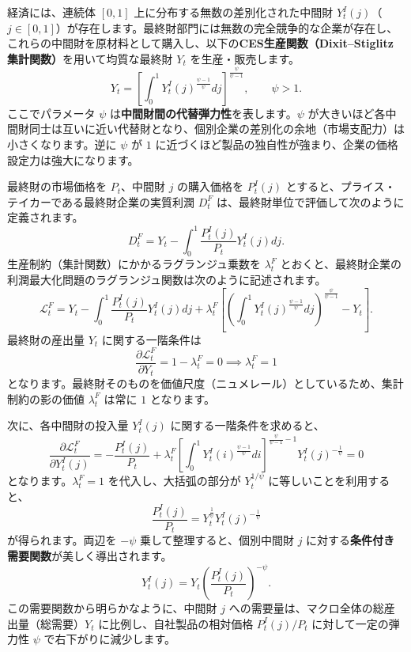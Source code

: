 \documentclass[
  japanese,
  lualatex,
  ja=standard,
  12pt,
  a4paper]{ltjsarticle}
\begin{document}
経済には、連続体 \([0, 1]\) 上に分布する無数の差別化された中間財
\(Y_t^I(j)\)（\(j \in [0, 1]\)）が存在します。最終財部門には無数の完全競争的な企業が存在し、これらの中間財を原材料として購入し、以下の\textbf{CES生産関数（Dixit--Stiglitz
集計関数）}を用いて均質な最終財 \(Y_t\) を生産・販売します。 \[
Y_t = \left[ \int_0^1 Y_t^I(j)^{\frac{\psi-1}{\psi}} dj \right]^{\frac{\psi}{\psi-1}}, \qquad \psi > 1.
\] ここでパラメータ \(\psi\)
は\textbf{中間財間の代替弾力性}を表します。\(\psi\)
が大きいほど各中間財同士は互いに近い代替財となり、個別企業の差別化の余地（市場支配力）は小さくなります。逆に
\(\psi\) が \(1\)
に近づくほど製品の独自性が強まり、企業の価格設定力は強大になります。

最終財の市場価格を \(P_t\)、中間財 \(j\) の購入価格を \(P_t^I(j)\)
とすると、プライス・テイカーである最終財企業の実質利潤 \(D_t^F\)
は、最終財単位で評価して次のように定義されます。 \[
D_t^F = Y_t - \int_0^1 \frac{P_t^I(j)}{P_t} Y_t^I(j) dj.
\] 生産制約（集計関数）にかかるラグランジュ乗数を \(\lambda_t^F\)
とおくと、最終財企業の利潤最大化問題のラグランジュ関数は次のように記述されます。
\[
\mathcal{L}_t^F = Y_t - \int_0^1 \frac{P_t^I(j)}{P_t} Y_t^I(j) dj + \lambda_t^F \left[ \left( \int_0^1 Y_t^I(j)^{\frac{\psi-1}{\psi}} dj \right)^{\frac{\psi}{\psi-1}} - Y_t \right].
\] 最終財の産出量 \(Y_t\) に関する一階条件は \[
\frac{\partial \mathcal{L}_t^F}{\partial Y_t} = 1 - \lambda_t^F = 0 \implies \lambda_t^F = 1
\]
となります。最終財そのものを価値尺度（ニュメレール）としているため、集計制約の影の価値
\(\lambda_t^F\) は常に \(1\) となります。

次に、各中間財の投入量 \(Y_t^I(j)\) に関する一階条件を求めると、 \[
\frac{\partial \mathcal{L}_t^F}{\partial Y_t^I(j)} = -\frac{P_t^I(j)}{P_t} + \lambda_t^F \left[ \int_0^1 Y_t^I(i)^{\frac{\psi-1}{\psi}} di \right]^{\frac{\psi}{\psi-1} - 1} Y_t^I(j)^{-\frac{1}{\psi}} = 0
\] となります。\(\lambda_t^F = 1\) を代入し、大括弧の部分が
\(Y_t^{1/\psi}\) に等しいことを利用すると、 \[
\frac{P_t^I(j)}{P_t} = Y_t^{\frac{1}{\psi}} Y_t^I(j)^{-\frac{1}{\psi}}
\] が得られます。両辺を \(-\psi\) 乗して整理すると、個別中間財 \(j\)
に対する\textbf{条件付き需要関数}が美しく導出されます。 \[
Y_t^I(j) = Y_t \left( \frac{P_t^I(j)}{P_t} \right)^{-\psi}.
\] この需要関数から明らかなように、中間財 \(j\)
への需要量は、マクロ全体の総産出量（総需要）\(Y_t\)
に比例し、自社製品の相対価格 \(P_t^I(j)/P_t\) に対して一定の弾力性
\(\psi\) で右下がりに減少します。
\end{document}
